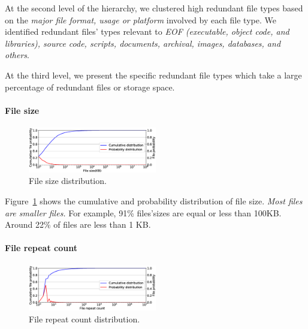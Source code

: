 At the second level of the hierarchy, we clustered high redundant file types based on the \textit{major file format, usage or platform} involved by each file type. We identified redundant files' types relevant to \textit{EOF (executable, object code, and libraries), source code, scripts, documents, archival, images, databases, and others}.

At the third level, we present the specific redundant file types which take a large percentage of redundant files or storage space.



\paragraph{File size}

\begin{figure}
	\centering
	\includegraphics[width=0.5\textwidth]{graphs/File_size-KB.eps}
	\caption{File size distribution.
		}
		\label{fig:file-size}
		\end{figure}
		
		Figure~\ref{fig:file-size} shows the cumulative and probability distribution of file size.
		\textit{Most files are smaller files.} For example, 91\% files'sizes are equal or less than 100KB. 
		Around 22\% of files are less than 1 KB.


\paragraph{File repeat count}
\begin{figure}
	\centering
	\includegraphics[width=0.5\textwidth]{graphs/File_repeat_count.eps}
	\caption{File repeat count distribution.
	}
	\label{fig:file-repeat-cnt}
\end{figure}

